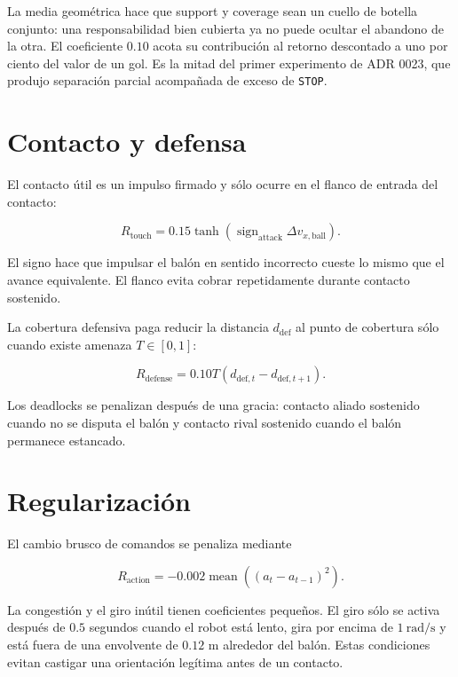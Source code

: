 \documentclass[11pt]{article}
\begin{document}
La media geométrica hace que support y coverage sean un cuello de botella conjunto: una
responsabilidad bien cubierta ya no puede ocultar el abandono de la otra. El coeficiente $0.10$
acota su contribución al retorno descontado a uno por ciento del valor de un gol. Es la mitad del
primer experimento de ADR 0023, que produjo separación parcial acompañada de exceso de
\texttt{STOP}.

\section{Contacto y defensa}

El contacto útil es un impulso firmado y sólo ocurre en el flanco de entrada del contacto:

\begin{equation}
R_{\mathrm{touch}} = 0.15\tanh\!\left(
\operatorname{sign}_{\mathrm{attack}}\Delta v_{x,\mathrm{ball}}
\right).
\end{equation}

El signo hace que impulsar el balón en sentido incorrecto cueste lo mismo que el avance
equivalente. El flanco evita cobrar repetidamente durante contacto sostenido.

La cobertura defensiva paga reducir la distancia $d_{\mathrm{def}}$ al punto de cobertura sólo
cuando existe amenaza $T\in[0,1]$:

\begin{equation}
R_{\mathrm{defense}} = 0.10T
\left(d_{\mathrm{def},t}-d_{\mathrm{def},t+1}\right).
\end{equation}

Los deadlocks se penalizan después de una gracia: contacto aliado sostenido cuando no se disputa
el balón y contacto rival sostenido cuando el balón permanece estancado.

\section{Regularización}

El cambio brusco de comandos se penaliza mediante

\begin{equation}
R_{\mathrm{action}}=-0.002\operatorname{mean}\!\left((a_t-a_{t-1})^2\right).
\end{equation}

La congestión y el giro inútil tienen coeficientes pequeños. El giro sólo se activa después de
$0.5$ segundos cuando el robot está lento, gira por encima de $1\ \mathrm{rad/s}$ y está fuera
de una envolvente de $0.12$ m alrededor del balón. Estas condiciones evitan castigar una
orientación legítima antes de un contacto.
\end{document}
